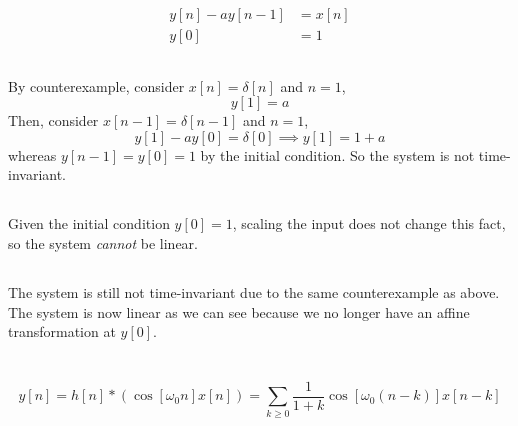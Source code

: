 \documentclass{article}
\begin{document}
\newpage
\section{}

\begin{align}
    y[n] - ay[n - 1] &= x[n] \\
    y[0] &= 1
\end{align}

\subsection{}

By counterexample, consider \(x[n] = \delta[n]\) and \(n = 1\),
\begin{equation}
    y[1] = a
\end{equation}
Then, consider \(x[n - 1] = \delta[n - 1]\) and \(n = 1\),
\begin{equation}
    y[1] - a y[0] = \delta[0] \implies y[1] = 1 + a
\end{equation}
whereas \(y[n - 1] = y[0] = 1\) by the initial condition.
So the system is not time-invariant.

\subsection{}

Given the initial condition \(y[0] = 1\), scaling the input does not change this fact, so the system \emph{cannot} be linear.

\subsection{}

The system is still not time-invariant due to the same counterexample as above.
The system is now linear as we can see because we no longer have an affine transformation at \(y[0]\).

\newpage
\section{}

\begin{equation}
    y[n] = h[n] \ast (\cos[\omega_0 n] x[n]) = \sum_{k \geqslant 0} \frac{1}{1 + k} \cos[\omega_0 (n - k)] x[n - k]
\end{equation}
\end{document}
